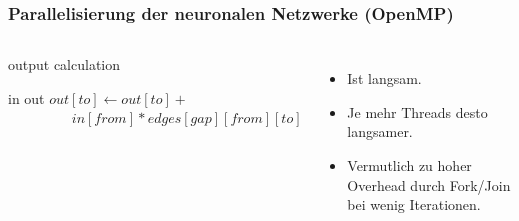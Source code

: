 \begin{frame}
    \frametitle{Parallelisierung der neuronalen Netzwerke (OpenMP)}
    \begin{columns}[t]
        \vspace{-0.5cm}
        \begin{algorithm}[H]
            \caption{output calculation}
            \begin{algorithmic}[1]
                \Require in
                \Ensure out
                    \State {}
                        \State $out[to] \gets out[to] +{}$
                        \State $\qquad\qquad\;\; in[from] * edges[gap][from][to]$
                        \EndFor
                    \EndParDo
                    \State {}
                \EndFor
            \end{algorithmic}
        \end{algorithm}
        \vspace{-0.5cm}
        \pause
        \begin{itemize}
            \item Ist langsam.
            \item Je mehr Threads desto langsamer.
            \item Vermutlich zu hoher Overhead durch Fork/Join bei wenig Iterationen.
        \end{itemize}
    \end{columns}
\end{frame}
